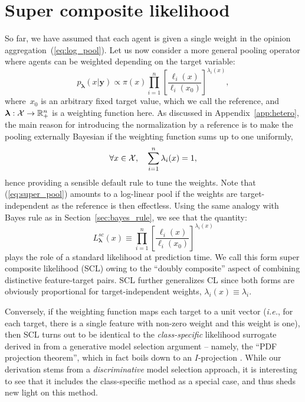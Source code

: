 \documentclass[english]{scrartcl}
\def\y{{\mathbf{y}}}
\newcommand{\blambda}{{\boldsymbol{\lambda}}}
\begin{document}
\section{Super composite likelihood}
\label{sec:super}

So far, we have assumed that each agent is given a single weight in the opinion aggregation~(\ref{eq:log_pool}). Let us now consider a more general pooling operator where agents can be weighted depending on the target variable:
\begin{equation}
\label{eq:super_pool}
p_\blambda(x|\y) \propto \pi(x) \prod_{i=1}^n \left[\frac{\ell_i(x)}{\ell_i(x_0)}\right]^{\lambda_i(x)},    
\end{equation}
where~$x_0$ is an arbitrary fixed target value, which we call the reference, and $\blambda: {\cal X}\to \mathbb{R}_+^n$ is a weighting function here. As discussed in Appendix~\ref{app:hetero}, the main reason for introducing the normalization by a reference is to make the pooling externally Bayesian if the weighting function sums up to one uniformly,
$$
\forall x\in{\cal X},\quad
\sum_{i=1}^n \lambda_i(x) = 1,
$$
hence providing a sensible default rule to tune the weights. Note that (\ref{eq:super_pool}) amounts to a log-linear pool if the weights are target-independent as the reference is then effectless. Using the same analogy with Bayes rule as in Section~\ref{sec:bayes_rule}, we see that the quantity:
\begin{equation}
\label{eq:super_comp_lik}
L^{sc}_\blambda(x) \equiv 
\prod_{i=1}^n \left[\frac{\ell_i(x)}{\ell_i(x_0)}\right]^{\lambda_i(x)}
\end{equation} 
plays the role of a standard likelihood at prediction time. We call this form super composite likelihood (SCL) owing to the ``doubly composite'' aspect of combining distinctive feature-target pairs. SCL further generalizes CL since both forms are obviously proportional for target-independent weights, $\lambda_i(x)\equiv \lambda_i$.


Conversely, if the weighting function maps each target to a unit vector ({\em i.e.}, for each target, there is a single feature with non-zero weight and this weight is one), then SCL turns out to be identical to the {\em class-specific} likelihood surrogate derived in \cite{Baggenstoss-03} from a generative model selection argument -- namely, the ``PDF projection theorem'', which in fact boils down to an $I$-projection \cite{Minka-04}. While our derivation stems from a {\em discriminative} model selection approach, it is interesting to see that it includes the class-specific method as a special case, and thus sheds new light on this method.
\end{document}
